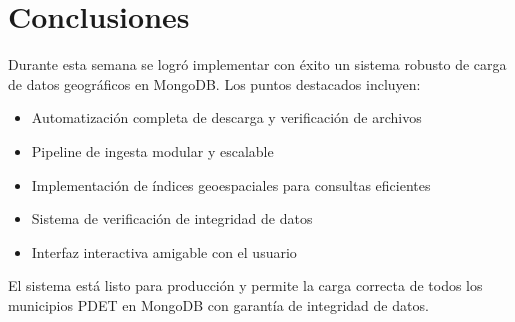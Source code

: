 \documentclass[12pt,a4paper]{article}
\begin{document}
\section{Conclusiones}

Durante esta semana se logró implementar con éxito un sistema robusto de carga de datos geográficos en MongoDB. Los puntos destacados incluyen:

\begin{itemize}
  \item Automatización completa de descarga y verificación de archivos
  \item Pipeline de ingesta modular y escalable
  \item Implementación de índices geoespaciales para consultas eficientes
  \item Sistema de verificación de integridad de datos
  \item Interfaz interactiva amigable con el usuario
\end{itemize}

El sistema está listo para producción y permite la carga correcta de todos los municipios PDET en MongoDB con garantía de integridad de datos.
\end{document}
